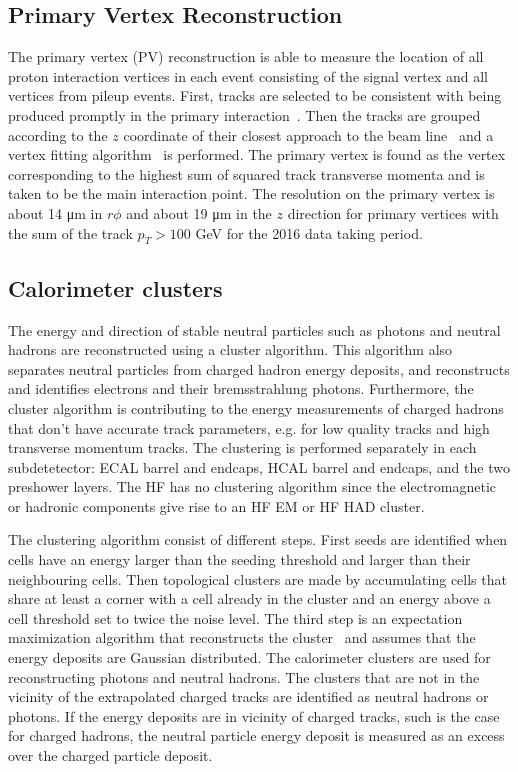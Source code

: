 \subsection{Primary Vertex Reconstruction}
The primary vertex (PV) reconstruction is able to measure the location of all proton interaction vertices in each event consisting of the signal vertex and all vertices from pileup events. First, tracks are selected  to be consistent with being produced promptly in the primary interaction~\cite{Chatrchyan:1704291}. Then the tracks are grouped according to the $z$ coordinate of their closest approach to the beam line~\cite{726788} and a vertex fitting algorithm~\cite{Waltenberger:1166320} is performed. The primary vertex is found as the vertex corresponding to the highest sum of squared track transverse momenta and is taken to be the main interaction point. The resolution on the primary vertex is about 14 \si{ \micro \meter} in $r\phi$ and about 19 \si{ \micro \meter} in the $z$ direction for primary vertices with the sum of the track $p_T > 100$ \si{ \GeV} for the 2016 data taking period.

\subsection{Calorimeter clusters}
\label{sec:calo}
The energy and direction of stable neutral particles such as photons and neutral hadrons are reconstructed using a cluster algorithm.  This algorithm also separates neutral particles from charged hadron energy deposits, 
and reconstructs and identifies electrons and their bremsstrahlung photons. Furthermore, the cluster algorithm is contributing to the energy measurements of charged hadrons that don't have accurate track parameters, e.g. for low quality tracks and high transverse momentum tracks. The clustering is performed separately in each subdetetector: ECAL barrel and endcaps, HCAL barrel and endcaps, and the two preshower layers. The HF has no clustering algorithm since the electromagnetic or hadronic components give rise to an HF EM or HF HAD cluster. 

The clustering algorithm consist of different steps. First seeds are identified when cells have an energy larger than the seeding threshold and larger than their neighbouring cells. Then topological clusters are made by accumulating cells that share at least a corner with a cell already in the cluster and an energy above a cell threshold set to twice the noise level. The third step is an expectation maximization algorithm that reconstructs the cluster~\cite{CMS-PRF-14-001} and assumes that  the energy deposits are Gaussian distributed. The calorimeter clusters are used for reconstructing photons and neutral hadrons. The  clusters that are not in the vicinity of the extrapolated charged tracks are identified as neutral hadrons or photons. If the energy deposits are in vicinity of charged tracks, such is the case for charged hadrons, the neutral particle energy deposit is measured as an excess over the charged particle deposit. %


